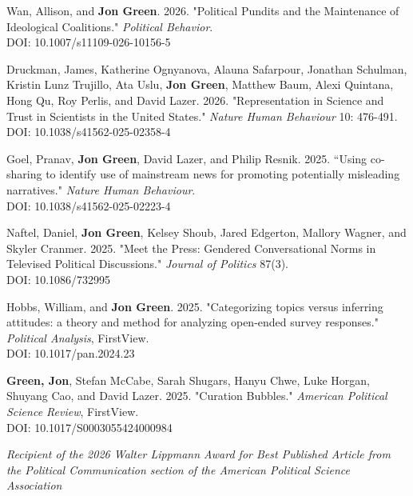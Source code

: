 \documentclass[letterpaper]{article}
\renewenvironment{itemize}{
  \begin{list}{}{
    \setlength{\leftmargin}{1.5em}
  }
}{
  \end{list}
}
\begin{document}
\begin{etaremune}

\item Wan, Allison, and \textbf{Jon Green}. 2026. "Political Pundits and the Maintenance of Ideological Coalitions." \textit{Political Behavior}.\\
DOI: 10.1007/s11109-026-10156-5

\item Druckman, James, Katherine Ognyanova, Alauna Safarpour, Jonathan Schulman, Kristin Lunz Trujillo, Ata Uslu, \textbf{Jon Green}, Matthew Baum, Alexi Quintana, Hong Qu, Roy Perlis, and David Lazer. 2026. "Representation in Science and Trust in Scientists in the United States." \textit{Nature Human Behaviour} 10: 476-491.\\
DOI: 10.1038/s41562-025-02358-4

\item Goel, Pranav, \textbf{Jon Green}, David Lazer, and Philip Resnik. 2025. ``Using co-sharing to identify use of mainstream news for promoting potentially misleading narratives." \textit{Nature Human Behaviour}.\\
DOI: 10.1038/s41562-025-02223-4

\item Naftel, Daniel, \textbf{Jon Green}, Kelsey Shoub, Jared Edgerton, Mallory Wagner, and Skyler Cranmer. 2025. "Meet the Press: Gendered Conversational Norms in Televised Political Discussions." \textit{Journal of Politics} 87(3).\\
DOI: 10.1086/732995

\item Hobbs, William, and \textbf{Jon Green}. 2025. "Categorizing topics versus inferring attitudes: a theory and method for analyzing open-ended survey responses." \textit{Political Analysis}, FirstView.\\
DOI: 10.1017/pan.2024.23

\item \textbf{Green, Jon}, Stefan McCabe, Sarah Shugars, Hanyu Chwe, Luke Horgan, Shuyang Cao, and David Lazer. 2025. "Curation Bubbles." \textit{American Political Science Review}, FirstView.\\
DOI: 10.1017/S0003055424000984
\begin{itemize}
\item \textit{Recipient of the 2026 Walter Lippmann Award for Best Published Article from the Political Communication section of the American Political Science Association}
\end{itemize}


\end{etaremune}
\end{document}
